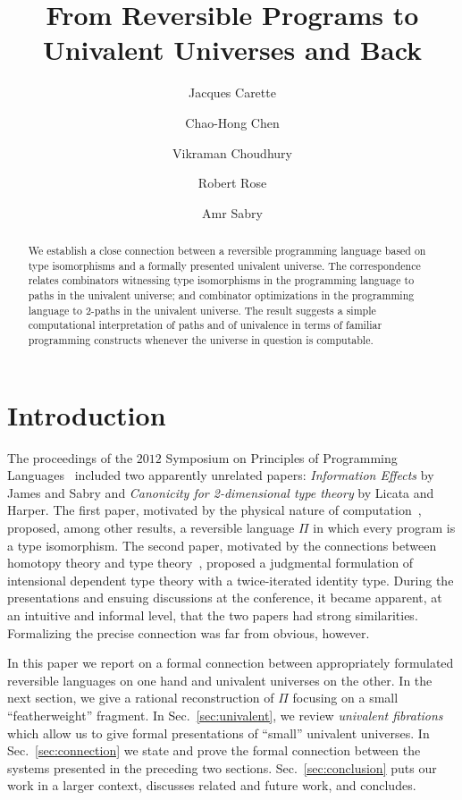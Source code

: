 \documentclass{entcs}
\begin{document}
\begin{frontmatter}
\title{From Reversible Programs to \\ Univalent Universes and Back}
\author{Jacques Carette}
\address{McMaster University}
\author{Chao-Hong Chen}
\address{Indiana University}
\author{Vikraman Choudhury}
\author{Robert Rose}
\author{Amr Sabry}
\address{Indiana University}

\begin{abstract}
  We establish a close connection between a reversible programming language
  based on type isomorphisms and a formally presented univalent universe. The
  correspondence relates combinators witnessing type isomorphisms in the
  programming language to paths in the univalent universe; and combinator
  optimizations in the programming language to 2-paths in the univalent
  universe. The result suggests a simple computational interpretation of paths
  and of univalence in terms of familiar programming constructs whenever the
  universe in question is computable.
\end{abstract}

\end{frontmatter}

\section{Introduction}

The proceedings of the $2012$ Symposium on Principles of Programming
Languages~\cite{Field:2012:2103656} included two apparently unrelated papers:
\emph{Information Effects} by James and Sabry and \emph{Canonicity for
  2-dimensional type theory} by Licata and Harper. The first paper, motivated by
the physical nature of
computation~\cite{Landauer:1961,PhysRevA.32.3266,Toffoli:1980,bennett1985fundamental,Frank:1999:REC:930275},
proposed, among other results, a reversible language $\Pi$ in which every
program is a type isomorphism. The second paper, motivated by the connections
between homotopy theory and type theory~\cite{vv06,hottbook}, proposed a
judgmental formulation of intensional dependent type theory with a
twice-iterated identity type. During the presentations and ensuing discussions
at the conference, it became apparent, at an intuitive and informal level, that
the two papers had strong similarities. Formalizing the precise connection was
far from obvious, however.

In this paper we report on a formal connection between appropriately formulated
reversible languages on one hand and univalent universes on the other. In the
next section, we give a rational reconstruction of $\Pi$ focusing on a small
``featherweight'' fragment. In Sec.~\ref{sec:univalent}, we review
\emph{univalent fibrations} which allow us to give formal presentations of
``small'' univalent universes. In Sec.~\ref{sec:connection} we state and prove
the formal connection between the systems presented in the preceding two
sections. Sec.~\ref{sec:conclusion} puts our work in a larger context, discusses
related and future work, and concludes.
\end{document}
